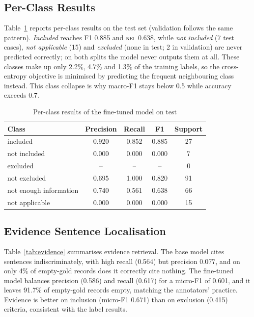 \documentclass[conference]{IEEEtran}
\newcommand{\NEI}{\textsc{nei}}
\begin{document}
\subsection{Per-Class Results}
Table~\ref{tab:perclass} reports per-class results on the test set (validation follows the same pattern). \emph{Included} reaches F1 0.885 and \NEI\ 0.638, while \emph{not included} (7 test cases), \emph{not applicable} (15) and \emph{excluded} (none in test; 2 in validation) are never predicted correctly; on both splits the model never outputs them at all. These classes make up only 2.2\%, 4.7\% and 1.3\% of the training labels, so the cross-entropy objective is minimised by predicting the frequent neighbouring class instead. This class collapse is why macro-F1 stays below 0.5 while accuracy exceeds 0.7.

\begin{table}[t]
\caption{Per-class results of the fine-tuned model on test}
\label{tab:perclass}
\centering
\footnotesize
\begin{tabular}{lcccc}
\toprule
Class & Precision & Recall & F1 & Support\\
\midrule
included & 0.920 & 0.852 & 0.885 & 27\\
not included & 0.000 & 0.000 & 0.000 & 7\\
excluded & -- & -- & -- & 0\\
not excluded & 0.695 & 1.000 & 0.820 & 91\\
not enough information & 0.740 & 0.561 & 0.638 & 66\\
not applicable & 0.000 & 0.000 & 0.000 & 15\\
\bottomrule
\end{tabular}
\end{table}

\subsection{Evidence Sentence Localisation}
Table~\ref{tab:evidence} summarises evidence retrieval. The base model cites sentences indiscriminately, with high recall (0.564) but precision 0.077, and on only 4\% of empty-gold records does it correctly cite nothing. The fine-tuned model balances precision (0.586) and recall (0.617) for a micro-F1 of 0.601, and it leaves 91.7\% of empty-gold records empty, matching the annotators' practice. Evidence is better on inclusion (micro-F1 0.671) than on exclusion (0.415) criteria, consistent with the label results.
\end{document}
